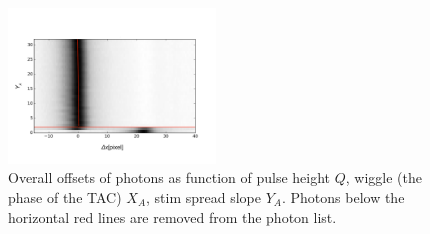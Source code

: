 \documentclass[12pt, preprint]{aastex61}
\begin{document}
\begin{figure}[p]
\begin{center}
\includegraphics[width=0.49\textwidth]{figures/ya-y_tot-new}
\end{center}
\caption{%
  \label{meta}
  Overall offsets of photons as function of pulse height $Q$,  wiggle (the phase of the TAC)  $X_A$,  stim spread slope $Y_A$.
  Photons below the horizontal red lines are removed from the photon list.
  }
\end{figure}
\end{document}
